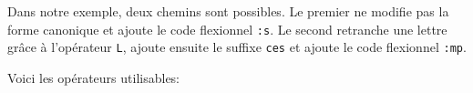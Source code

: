 \bigskip
\noindent Dans notre exemple, deux chemins sont possibles. Le premier ne modifie pas la forme
canonique et ajoute le code flexionnel \verb+:s+. Le second retranche une lettre grâce à l’opérateur 
\verb+L+, ajoute ensuite le suffixe \verb+ces+ et ajoute le code flexionnel \verb+:mp+.

Voici les opérateurs utilisables:



